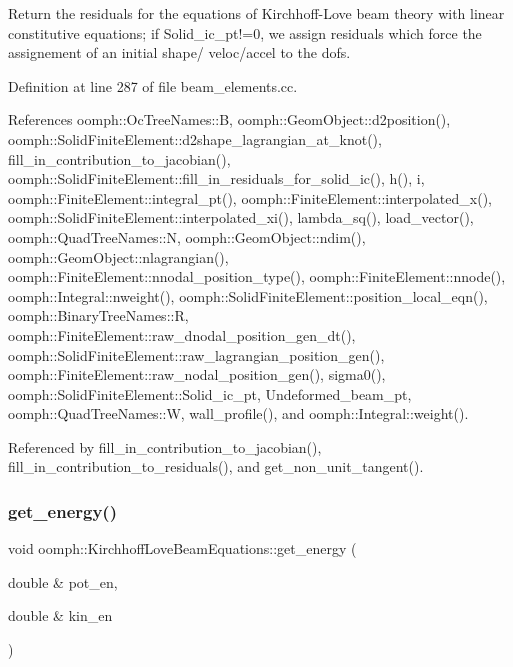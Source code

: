 Return the residuals for the equations of Kirchhoff-\/\+Love beam theory with linear constitutive equations; if Solid\+\_\+ic\+\_\+pt!=0, we assign residuals which force the assignement of an initial shape/ veloc/accel to the dofs. 

Definition at line 287 of file beam\+\_\+elements.\+cc.



References oomph\+::\+Oc\+Tree\+Names\+::B, oomph\+::\+Geom\+Object\+::d2position(), oomph\+::\+Solid\+Finite\+Element\+::d2shape\+\_\+lagrangian\+\_\+at\+\_\+knot(), fill\+\_\+in\+\_\+contribution\+\_\+to\+\_\+jacobian(), oomph\+::\+Solid\+Finite\+Element\+::fill\+\_\+in\+\_\+residuals\+\_\+for\+\_\+solid\+\_\+ic(), h(), i, oomph\+::\+Finite\+Element\+::integral\+\_\+pt(), oomph\+::\+Finite\+Element\+::interpolated\+\_\+x(), oomph\+::\+Solid\+Finite\+Element\+::interpolated\+\_\+xi(), lambda\+\_\+sq(), load\+\_\+vector(), oomph\+::\+Quad\+Tree\+Names\+::N, oomph\+::\+Geom\+Object\+::ndim(), oomph\+::\+Geom\+Object\+::nlagrangian(), oomph\+::\+Finite\+Element\+::nnodal\+\_\+position\+\_\+type(), oomph\+::\+Finite\+Element\+::nnode(), oomph\+::\+Integral\+::nweight(), oomph\+::\+Solid\+Finite\+Element\+::position\+\_\+local\+\_\+eqn(), oomph\+::\+Binary\+Tree\+Names\+::R, oomph\+::\+Finite\+Element\+::raw\+\_\+dnodal\+\_\+position\+\_\+gen\+\_\+dt(), oomph\+::\+Solid\+Finite\+Element\+::raw\+\_\+lagrangian\+\_\+position\+\_\+gen(), oomph\+::\+Finite\+Element\+::raw\+\_\+nodal\+\_\+position\+\_\+gen(), sigma0(), oomph\+::\+Solid\+Finite\+Element\+::\+Solid\+\_\+ic\+\_\+pt, Undeformed\+\_\+beam\+\_\+pt, oomph\+::\+Quad\+Tree\+Names\+::W, wall\+\_\+profile(), and oomph\+::\+Integral\+::weight().



Referenced by fill\+\_\+in\+\_\+contribution\+\_\+to\+\_\+jacobian(), fill\+\_\+in\+\_\+contribution\+\_\+to\+\_\+residuals(), and get\+\_\+non\+\_\+unit\+\_\+tangent().

\mbox{\label{classoomph_1_1KirchhoffLoveBeamEquations_ac593b9b056f6e89ba4f82ad2d303bdf6}} 
\subsubsection{\texorpdfstring{get\+\_\+energy()}{get\_energy()}\hspace{0.1cm}{\footnotesize\ttfamily [1/2]}}
{\footnotesize\ttfamily void oomph\+::\+Kirchhoff\+Love\+Beam\+Equations\+::get\+\_\+energy (\begin{DoxyParamCaption}\item[{double \&}]{pot\+\_\+en,  }\item[{double \&}]{kin\+\_\+en }\end{DoxyParamCaption})}



